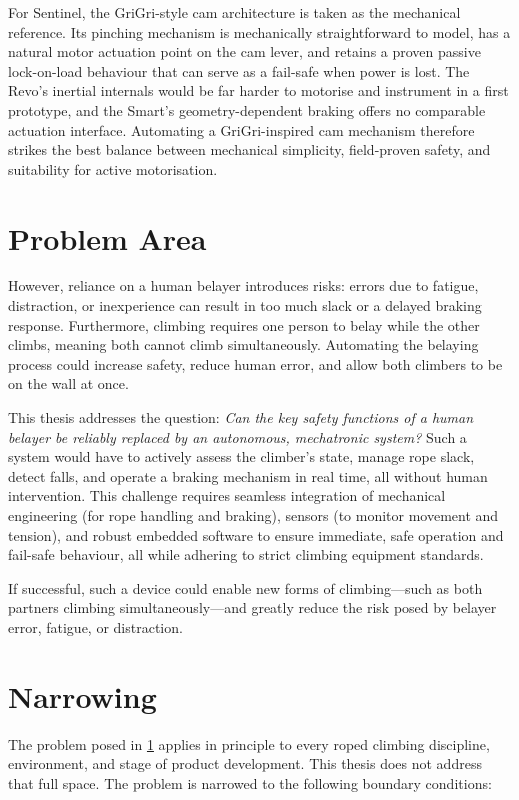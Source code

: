 For Sentinel, the GriGri-style cam architecture is taken as the mechanical
reference. Its pinching mechanism is mechanically straightforward to model,
has a natural motor actuation point on the cam lever, and retains a proven
passive lock-on-load behaviour that can serve as a fail-safe when power is
lost. The Revo's inertial internals would be far harder to motorise and
instrument in a first prototype, and the Smart's geometry-dependent braking
offers no comparable actuation interface. Automating a GriGri-inspired cam
mechanism therefore strikes the best balance between mechanical simplicity,
field-proven safety, and suitability for active motorisation.

\section{Problem Area}
\label{sec:project-area}

However, reliance on a human belayer introduces risks: errors due to fatigue, distraction, or inexperience can result in too much slack or a delayed braking response. Furthermore, climbing requires one person to belay while the other climbs, meaning both cannot climb simultaneously. Automating the belaying process could increase safety, reduce human error, and allow both climbers to be on the wall at once.

This thesis addresses the question: \emph{Can the key safety functions of a human belayer be reliably replaced by an autonomous, mechatronic system?} Such a system would have to actively assess the climber’s state, manage rope slack, detect falls, and operate a braking mechanism in real time, all without human intervention. This challenge requires seamless integration of mechanical engineering (for rope handling and braking), sensors (to monitor movement and tension), and robust embedded software to ensure immediate, safe operation and fail-safe behaviour, all while adhering to strict climbing equipment standards.

If successful, such a device could enable new forms of climbing---such as both partners climbing simultaneously---and greatly reduce the risk posed by belayer error, fatigue, or distraction.

\section{Narrowing}
\label{sec:narrowing}

The problem posed in \cref{sec:project-area} applies in principle to every
roped climbing discipline, environment, and stage of product development.
This thesis does not address that full space. The problem is narrowed to
the following boundary conditions:

